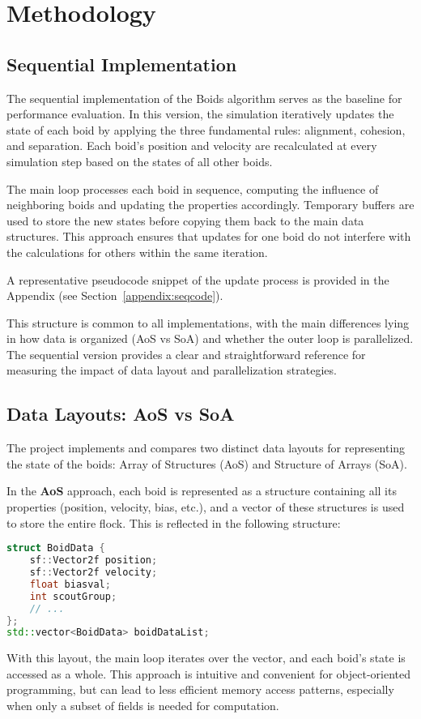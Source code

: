 \documentclass[10pt,twocolumn,letterpaper]{article}
\begin{document}
\section{Methodology}
\subsection{Sequential Implementation}
The sequential implementation of the Boids algorithm serves as the baseline for performance evaluation. In this version, the simulation iteratively updates the state of each boid by applying the three fundamental rules: alignment, cohesion, and separation. Each boid's position and velocity are recalculated at every simulation step based on the states of all other boids.

The main loop processes each boid in sequence, computing the influence of neighboring boids and updating the properties accordingly. Temporary buffers are used to store the new states before copying them back to the main data structures. This approach ensures that updates for one boid do not interfere with the calculations for others within the same iteration.

A representative pseudocode snippet of the update process is provided in the Appendix (see Section~\ref{appendix:seqcode}).

This structure is common to all implementations, with the main differences lying in how data is organized (AoS vs SoA) and whether the outer loop is parallelized. The sequential version provides a clear and straightforward reference for measuring the impact of data layout and parallelization strategies.

\subsection{Data Layouts: AoS vs SoA}
The project implements and compares two distinct data layouts for representing the state of the boids: Array of Structures (AoS) and Structure of Arrays (SoA).

In the \textbf{AoS} approach, each boid is represented as a structure containing all its properties (position, velocity, bias, etc.), and a vector of these structures is used to store the entire flock. This is reflected in the following structure:
\begin{lstlisting}[language=C++]
struct BoidData {
    sf::Vector2f position;
    sf::Vector2f velocity;
    float biasval;
    int scoutGroup;
    // ...
};
std::vector<BoidData> boidDataList;
\end{lstlisting}
With this layout, the main loop iterates over the vector, and each boid's state is accessed as a whole. This approach is intuitive and convenient for object-oriented programming, but can lead to less efficient memory access patterns, especially when only a subset of fields is needed for computation.
\end{document}
